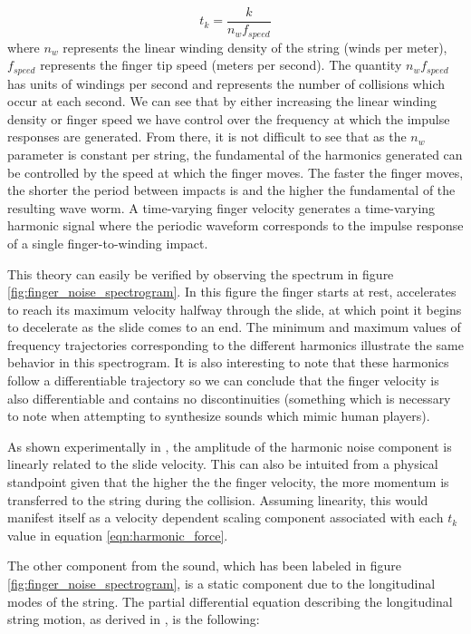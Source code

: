 \documentclass[main.tex]{subfiles}
\begin{document}
\begin{equation}
    t_k = \frac{k}{n_w f_{speed}}
    \label{eqn:t_k}
\end{equation}
where $n_w$ represents the linear winding density of the string (winds per meter), $f_{speed}$ represents the finger tip speed (meters per second). The quantity $n_w f_{speed}$ has units of windings per second and represents the number of collisions which occur at each second. We can see that by either increasing the linear winding density or finger speed we have control over the frequency at which the impulse responses are generated. From there, it is not difficult to see that as the $n_w$ parameter is constant per string, the fundamental of the harmonics generated can be controlled by the speed at which the finger moves. The faster the finger moves, the shorter the period between impacts is and the higher the fundamental of the resulting wave worm. A time-varying finger velocity generates a time-varying harmonic signal where the periodic waveform corresponds to the impulse response of a single finger-to-winding impact.

This theory can easily be verified by observing the spectrum in figure \ref{fig:finger_noise_spectrogram}. In this figure the finger starts at rest, accelerates to reach its maximum velocity halfway through the slide, at which point it begins to decelerate as the slide comes to an end. The minimum and maximum values of frequency trajectories corresponding to the different harmonics illustrate the same behavior in this spectrogram. It is also interesting to note that these harmonics follow a differentiable trajectory so we can conclude that the finger velocity is also differentiable and contains no discontinuities (something which is necessary to note when attempting to synthesize sounds which mimic human players).

As shown experimentally in , the amplitude of the harmonic noise component is linearly related to the slide velocity. This can also be intuited from a physical standpoint given that the higher the the finger velocity, the more momentum is transferred to the string during the collision. Assuming linearity, this would manifest itself as a velocity dependent scaling component associated with each $t_k$ value in equation \ref{eqn:harmonic_force}.

The other component from the sound, which has been labeled in figure \ref{fig:finger_noise_spectrogram}, is a static component due to the longitudinal modes of the string. The partial differential equation describing the longitudinal string motion, as derived in , is the following:
\end{document}
